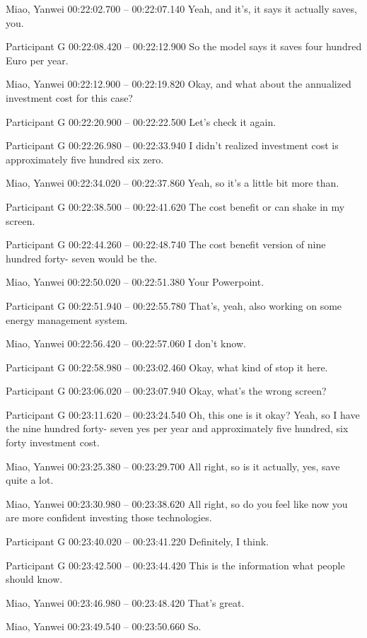{Miao, Yanwei 00:22:02.700 -- 00:22:07.140
Yeah, and it's, it says it actually saves, you.

Participant G 00:22:08.420 -- 00:22:12.900
So the model says it saves four hundred Euro per year.

Miao, Yanwei 00:22:12.900 -- 00:22:19.820
Okay, and what about the annualized investment cost for this case?

Participant G 00:22:20.900 -- 00:22:22.500
Let's check it again.

Participant G 00:22:26.980 -- 00:22:33.940
I didn't realized investment cost is approximately five hundred six zero.

Miao, Yanwei 00:22:34.020 -- 00:22:37.860
Yeah, so it's a little bit more than.

Participant G 00:22:38.500 -- 00:22:41.620
The cost benefit or can shake in my screen.

Participant G 00:22:44.260 -- 00:22:48.740
The cost benefit version of nine hundred forty- seven would be the.

Miao, Yanwei 00:22:50.020 -- 00:22:51.380
Your Powerpoint.

Participant G 00:22:51.940 -- 00:22:55.780
That's, yeah, also working on some energy management system.

Miao, Yanwei 00:22:56.420 -- 00:22:57.060
I don't know.

Participant G 00:22:58.980 -- 00:23:02.460
Okay, what kind of stop it here.

Participant G 00:23:06.020 -- 00:23:07.940
Okay, what's the wrong screen?

Participant G 00:23:11.620 -- 00:23:24.540
Oh, this one is it okay? Yeah, so I have the nine hundred forty- seven yes per year and approximately five hundred, six forty investment cost.

Miao, Yanwei 00:23:25.380 -- 00:23:29.700
All right, so is it actually, yes, save quite a lot.

Miao, Yanwei 00:23:30.980 -- 00:23:38.620
All right, so do you feel like now you are more confident investing those technologies.

Participant G 00:23:40.020 -- 00:23:41.220
Definitely, I think.

Participant G 00:23:42.500 -- 00:23:44.420
This is the information what people should know.

Miao, Yanwei 00:23:46.980 -- 00:23:48.420
That's great.

Miao, Yanwei 00:23:49.540 -- 00:23:50.660
So.

}
